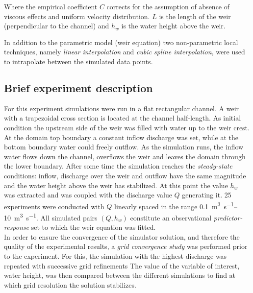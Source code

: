 \noindent Where the empirical coefficient $C$ corrects for the assumption of absence of viscous effects and uniform velocity distribution. $L$ is the length of the weir (perpendicular to the channel) and $h_w$ is the water height above the weir.

In addition to the parametric model (weir equation) two non-parametric local techniques, namely \emph{linear interpolation} and \emph{cubic spline interpolation}, were used to intrapolate between the simulated data points.\\


\subsection{Brief experiment description}\label{sec:cs1_brief_description}

 
For this experiment simulations were run in a flat rectangular channel.
A weir with a trapezoidal cross section is located at the channel half-length.
As initial condition the upstream side of the weir was filled with water up to the weir crest.
At the domain top boundary a constant inflow discharge was set, while at the bottom boundary water could freely outflow.
As the simulation runs, the inflow water flows down the channel, overflows the weir and leaves the domain through the lower boundary.
After some time the simulation reaches the \emph{steady-state} conditions: inflow, discharge over the weir and outflow have the same magnitude and the water height above the weir has stabilized.
At this point the value $h_w$ was extracted and was coupled with the discharge value $Q$ generating it.
\num{25} experiments were conducted with $Q$ linearly spaced in the range \SIrange{0.1}{10}{\cubic\meter\per\second}.
All simulated pairs $(Q, h_w)$ constitute an observational \emph{predictor-response} set to which the weir equation was fitted.
 \\

In order to ensure the convergence of the simulator solution, and therefore the quality of the experimental results, a \emph{grid convergence study} was performed prior to the experiment.
For this, the simulation with the highest discharge was repeated with successive grid refinements
The value of the variable of interest, water height, was then compared between the different simulations to find at which grid resolution the solution stabilizes.


